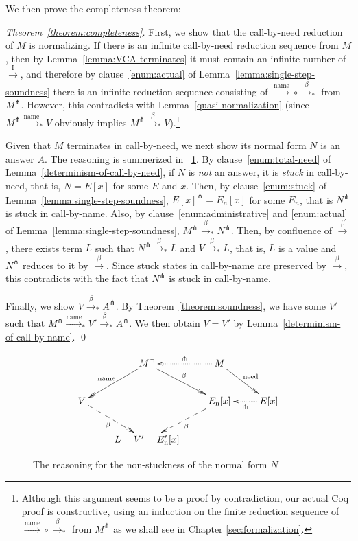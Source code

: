 \documentclass[english]{sumiilab-paper}
\newcommand{\EXPANDLET}[1]{#1^\pitchfork}
\newcommand{\FULLBETA}{\xrightarrow{\beta}}
\newcommand{\CALLBYNAME}{\xrightarrow{\mathrm{name}}}
\newcommand{\CALLBYNEEDI}{\xrightarrow{\mathrm{I}}}
\newcommand{\RTCLOS}[1]{#1_*}
\newcommand{\lemmaname}{Lemma}
\newcommand{\theoremname}{Theorem}
\begin{document}
We then prove the completeness theorem:
%
\begin{proof}[\theoremname~\ref{theorem:completeness}]\label{proof:completeness}
	First, we show that the call-by-need reduction of $M$ is normalizing.  If there is an infinite call-by-need reduction sequence from $M$, then by \lemmaname~\ref{lemma:VCA-terminates}
	it must contain an infinite number of $\CALLBYNEEDI$, and therefore by clause~\ref{enum:actual} of \lemmaname~\ref{lemma:single-step-soundness} there is an infinite reduction sequence consisting of ${\CALLBYNAME}\circ{\RTCLOS{\FULLBETA}}$ from $\EXPANDLET{M}$.  However, this contradicts with \lemmaname~\ref{quasi-normalization}  (since $\EXPANDLET{M} \RTCLOS{\CALLBYNAME} V$ obviously implies $\EXPANDLET{M} \RTCLOS{\FULLBETA} V$).\footnote{Although this argument seems to be a proof by contradiction, our actual Coq proof is constructive, using an induction on the finite reduction sequence of ${\CALLBYNAME}\circ{\RTCLOS{\FULLBETA}}$ from $\EXPANDLET{M}$ as we shall see in Chapter \ref{sec:formalization}.}

	Given that $M$ terminates in call-by-need, we next show its normal form $N$ is an answer $A$.
	The reasoning is summerized in \figurename~\ref{xypic}.
	By clause~\ref{enum:total-need} of \lemmaname~\ref{determinism-of-call-by-need},
	if $N$ is \emph{not} an answer, it is \emph{stuck} in call-by-need, that is, $N = E[x]$ for some $E$ and $x$.
	Then, by clause~\ref{enum:stuck} of \lemmaname~\ref{lemma:single-step-soundness},
	$\EXPANDLET{E[x]} = E_n[x]$ for some $E_n$, that is $\EXPANDLET{N}$ is stuck in call-by-name.
	Also, by clause~\ref{enum:administrative} and \ref{enum:actual} of \lemmaname~\ref{lemma:single-step-soundness}, $\EXPANDLET{M} \RTCLOS{\FULLBETA} \EXPANDLET{N}$.
	Then, by confluence of $\FULLBETA$, there exists term $L$ such that $\EXPANDLET{N} \RTCLOS{\FULLBETA} L$ and $V \RTCLOS{\FULLBETA} L$,
	that is, $L$ is a value and $\EXPANDLET{N}$ reduces to it by $\FULLBETA$.
	Since stuck states in call-by-name are preserved by $\FULLBETA$, this contradicts with the fact that $\EXPANDLET{N}$ is stuck in call-by-name.

	Finally, we show $V \RTCLOS{\FULLBETA} \EXPANDLET{A}$.
	By \theoremname~\ref{theorem:soundness}, we have some $V'$ such that $\EXPANDLET{M} \RTCLOS{\CALLBYNAME} V' \RTCLOS{\FULLBETA} \EXPANDLET{A}$.
	We then obtain $V=V'$ by \lemmaname~\ref{determinism-of-call-by-name}. \qed
\end{proof}
%
\begin{figure}[tp]
	\[\xymatrix{
		& \EXPANDLET{M} \ar@{->>}[ld]_-{\mathrm{name}} \ar@{->>}[rd]^-\beta & M \ar@{.>}[l]_-{\pitchfork} \ar@{->>}[rd]^-{\mathrm{need}}\\
		V \ar@{-->>}[rd]_-\beta & & E_\mathrm{n}[x] \ar@{-->>}[ld]^-\beta & E[x] \ar@{.>}[l]^-{\pitchfork} \\
		& L=V'=E_\mathrm{n}'[x] \\
	}\]
	\label{xypic}
	\caption{The reasoning for the non-stuckness of the normal form $N$}
\end{figure}
%
\end{document}
